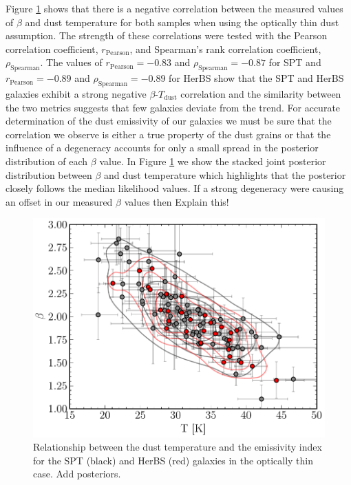 Figure \ref{fig:beta_t_correlation} shows that there is a negative correlation between the measured values of $\beta$ and dust temperature for both samples when using the optically thin dust assumption. The strength of these correlations were tested with the Pearson correlation coefficient, $r_{\textrm{Pearson}}$, and Spearman's rank correlation coefficient, $\rho_{\textrm{Spearman}}$. The values of $r_{\textrm{Pearson}} = -0.83$ and $\rho_{\textrm{Spearman}} = -0.87$ for SPT and $r_{\textrm{Pearson}} = -0.89$ and $\rho_{\textrm{Spearman}} = -0.89$ for HerBS show that the SPT and HerBS galaxies exhibit a strong negative $\beta$-$T_{\textrm{dust}}$ correlation and the similarity between the two metrics suggests that few galaxies deviate from the trend. For accurate determination of the dust emissivity of our galaxies we must be sure that the correlation we observe is either a true property of the dust grains or that the influence of a degeneracy accounts for only a small spread in the posterior distribution of each $\beta$ value. In Figure \ref{fig:beta_t_correlation} we show the stacked joint posterior distribution between $\beta$ and dust temperature which highlights that the posterior closely follows the median likelihood values. If a strong degeneracy were causing an offset in our measured $\beta$ values then {\color{red} Explain this!}

\begin{figure}
	\centering
	\includegraphics[width=0.75\columnwidth]{Figures/beta_t_correlation.pdf}
	\caption[Relationship between $\beta$ and $T_\textrm{dust}$ for SPT and HerBS galaxies]{Relationship between the dust temperature and the emissivity index for the SPT (black) and HerBS (red) galaxies in the optically thin case. {\color{red} Add posteriors.}}
	\label{fig:beta_t_correlation}
\end{figure}

